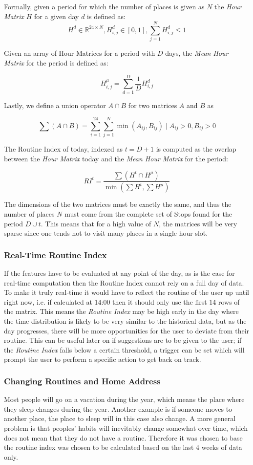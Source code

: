 Formally, given a period for which the number of places is given as $N$ the \textit{Hour Matrix} $H$ for a given day $d$ is defined as:
$$H^d \in \mathbb{R}^{24 \times N}, H^d_{i,j} \in [0,1], \sum_{j=1}^N H^d_{i,j} \leq 1$$

Given an array of Hour Matrices for a period with $D$ days, the \textit{Mean Hour Matrix} for the period is defined as:

$$H^{\mu}_{i,j} = \sum_{d=1}^D \frac{1}{D} H^d_{i,j}$$

Lastly, we define a union operator $A \cap B$ for two matrices $A$ and $B$ as 

$$\sum (A \cap B) = \sum_{i=1}^{24} \sum_{j=1}^{N} \min (A_{ij}, B_{ij}) \;|\; A_{ij} > 0, B_{ij} > 0$$

The Routine Index of today, indexed as $t=D+1$ is computed as the overlap between the \textit{Hour Matrix} today and the \textit{Mean Hour Matrix} for the period:

$$RI^{t} = \frac{\sum (H^t \cap H^{\mu})}{\min (\sum H^t, \sum H^{\mu})}$$

The dimensions of the two matrices must be exactly the same, and thus the number of places $N$ must come from the complete set of Stops found for the period $D \cup t$. This means that for a high value of $N$, the matrices will be very sparse since one tends not to visit many places in a single hour slot.

\subsubsection*{Real-Time Routine Index}
If the features have to be evaluated at any point of the day, as is the case for real-time computation then the Routine Index cannot rely on a full day of data. To make it truly real-time it would have to reflect the routine of the user up until right now, i.e. if calculated at 14:00 then it should only use the first 14 rows of the matrix. This means the \textit{Routine Index} may be high early in the day where the time distribution is likely to be very similar to the historical data, but as the day progresses, there will be more opportunities for the user to deviate from their routine. This can be useful later on if suggestions are to be given to the user; if the \textit{Routine Index} falls below a certain threshold, a trigger can be set which will prompt the user to perform a specific action to get back on track.

\subsubsection*{Changing Routines and Home Address}
Most people will go on a vacation during the year, which means the place where they sleep changes during the year. Another example is if someone moves to another place, the place to sleep will in this case also change. A more general problem is that peoples' habits will inevitably change somewhat over time, which does not mean that they do not have a routine. Therefore it was chosen to base the routine index was chosen to be calculated based on the last 4 weeks of data only. 

